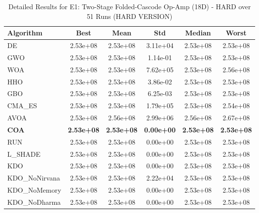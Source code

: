 \begin{table}[htbp]
\centering
\caption{Detailed Results for E1: Two-Stage Folded-Cascode Op-Amp (18D) - HARD over 51 Runs (HARD VERSION)}
\label{tab:P1_detailed}
\small
\begin{tabular}{lccccc}
\toprule
\textbf{Algorithm} & \textbf{Best} & \textbf{Mean} & \textbf{Std} & \textbf{Median} & \textbf{Worst} \\
\midrule
DE & 2.53e+08 & 2.53e+08 & 3.11e+04 & 2.53e+08 & 2.53e+08 \\
GWO & 2.53e+08 & 2.53e+08 & 1.14e-01 & 2.53e+08 & 2.53e+08 \\
WOA & 2.53e+08 & 2.53e+08 & 7.62e+05 & 2.53e+08 & 2.56e+08 \\
HHO & 2.53e+08 & 2.53e+08 & 3.86e-02 & 2.53e+08 & 2.53e+08 \\
GBO & 2.53e+08 & 2.53e+08 & 6.25e-03 & 2.53e+08 & 2.53e+08 \\
CMA_ES & 2.53e+08 & 2.53e+08 & 1.79e+05 & 2.53e+08 & 2.54e+08 \\
AVOA & 2.53e+08 & 2.56e+08 & 2.99e+06 & 2.56e+08 & 2.67e+08 \\
\textbf{COA} & \textbf{2.53e+08} & \textbf{2.53e+08} & \textbf{0.00e+00} & \textbf{2.53e+08} & \textbf{2.53e+08} \\
RUN & 2.53e+08 & 2.53e+08 & 0.00e+00 & 2.53e+08 & 2.53e+08 \\
L_SHADE & 2.53e+08 & 2.53e+08 & 0.00e+00 & 2.53e+08 & 2.53e+08 \\
KDO & 2.53e+08 & 2.53e+08 & 0.00e+00 & 2.53e+08 & 2.53e+08 \\
KDO_NoNirvana & 2.53e+08 & 2.53e+08 & 2.22e+04 & 2.53e+08 & 2.53e+08 \\
KDO_NoMemory & 2.53e+08 & 2.53e+08 & 0.00e+00 & 2.53e+08 & 2.53e+08 \\
KDO_NoDharma & 2.53e+08 & 2.53e+08 & 0.00e+00 & 2.53e+08 & 2.53e+08 \\
\bottomrule
\end{tabular}
\end{table}
